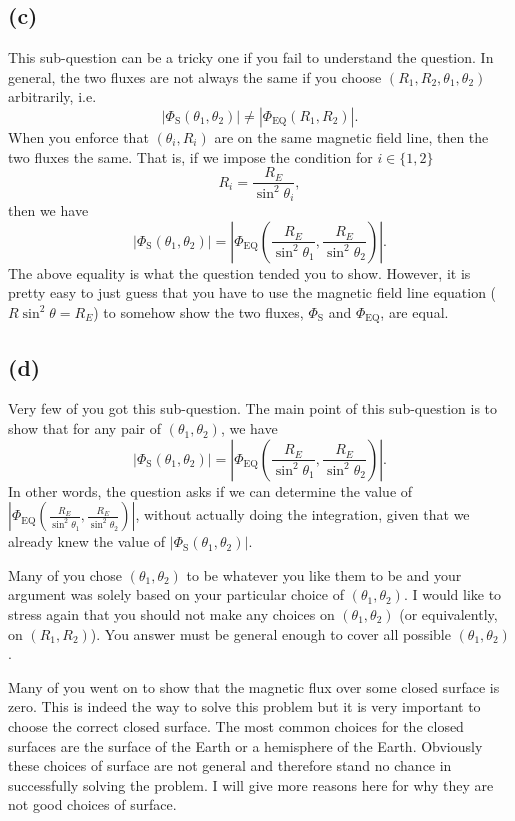\documentclass[a4paper]{article}
\begin{document}
\subsection*{(c)}
This sub-question can be a tricky one if you fail to understand the question.
In general, the two fluxes are not always the same if you choose $\left( R_1, R_2, \theta_1, \theta_2 \right) $ arbitrarily, i.e.
\[
|\Phi_\text{S}(\theta_1, \theta_2)|  \neq \left|\Phi_\text{EQ}(R_1, R_2)\right| 
.\] 
When you enforce that $(\theta_i, R_i)$ are on the same magnetic field line, then the two fluxes the same. That is, if we impose the condition for $i \in \{1, 2\}$
\[
R_i = \frac{R_E}{\sin^2\theta_i}
,\]
then we have
\[
|\Phi_\text{S}(\theta_1, \theta_2)| = \left|\Phi_\text{EQ}\left(\frac{R_E}{\sin^2\theta_1}, \frac{R_E}{\sin^2\theta_2}\right)\right| 
.\] 
The above equality is what the question tended you to show. However, it is pretty easy to just guess that you have to use the magnetic field line equation ($R \sin^2\theta = R_E$) to somehow show the two fluxes, $\Phi_\text{S}$ and $\Phi_\text{EQ}$, are equal.
\subsection*{(d)}
Very few of you got this sub-question. The main point of this sub-question is to show that for any pair of $(\theta_1, \theta_2)$, we have 
\[
|\Phi_\text{S}(\theta_1, \theta_2)| = \left|\Phi_\text{EQ}\left(\frac{R_E}{\sin^2\theta_1}, \frac{R_E}{\sin^2\theta_2}\right)\right| 
.\] 
In other words, the question asks if we can determine the value of $\left|\Phi_\text{EQ}\left(\frac{R_E}{\sin^2\theta_1}, \frac{R_E}{\sin^2\theta_2}\right)\right| $, without actually doing the integration, given that we already knew the value of $|\Phi_\text{S}(\theta_1, \theta_2)| $. 

Many of you chose $(\theta_1, \theta_2)$ to be whatever you like them to be and your argument was solely based on your particular choice of $(\theta_1, \theta_2)$. 
I would like to stress again that you should not make any choices on $(\theta_1, \theta_2)$ (or equivalently, on $(R_1, R_2)$). You answer must be general enough to cover all possible $(\theta_1, \theta_2)$.

Many of you went on to show that the magnetic flux over some closed surface is zero. This is indeed the way to solve this problem but it is very important to choose the correct closed surface.
The most common choices for the closed surfaces are the surface of the Earth or a hemisphere of the Earth. Obviously these choices of surface are not general and therefore stand no chance in successfully solving the problem. I will give more reasons here for why they are not good choices of surface.
\end{document}
